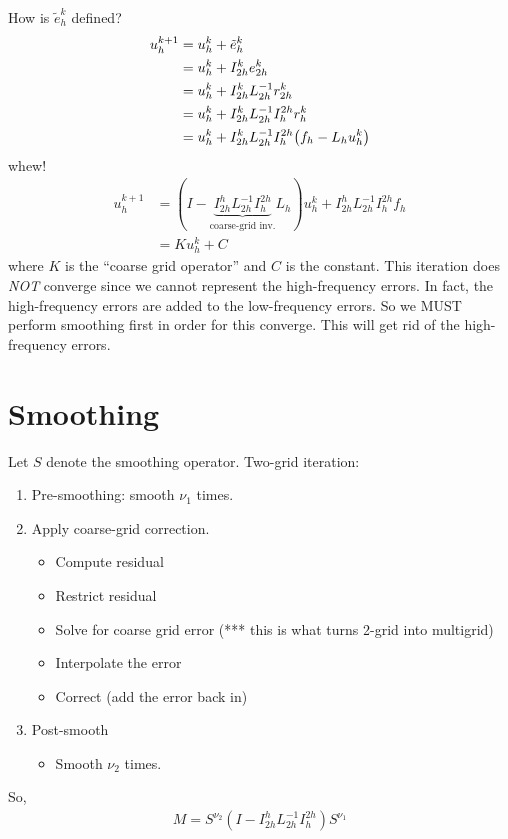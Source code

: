 \documentclass{article}
\begin{document}
        How is $\tilde{e}_h^k$ defined?
        \begin{align*}
            u_h^{k+1} &= u_h^k + \tilde{e}_h^k \\
            &= u_h^k + I_{2h}^ke_{2h}^k \\
            &= u_h^k + I_{2h}^kL_{2h}^{-1}r_{2h}^k \\
            &= u_h^k + I_{2h}^kL_{2h}^{-1}I_h^{2h}r_h^k \\
            &= u_h^k + I_{2h}^kL_{2h}^{-1}I_h^{2h}\qty(f_h - L_hu_h^k)
        \end{align*}
        whew!
        \begin{align*}
            u_h^{k+1} &= (I - \underbrace{I_{2h}^hL_{2h}^{-1}I_h^{2h}}_{\text{coarse-grid inv.}}L_h)u_h^k + I_{2h}^hL_{2h}^{-1}I_h^{2h}f_h \\
            &= Ku_h^k + C
        \end{align*}
        where $K$ is the ``coarse grid operator'' and $C$ is the constant.  This iteration does \emph{NOT} converge since we cannot represent the high-frequency errors.  In fact, the high-frequency errors are added to the low-frequency errors.  So we MUST perform smoothing first in order for this converge.  This will get rid of the high-frequency errors.

    \section{Smoothing}

        Let $S$ denote the smoothing operator.  Two-grid iteration:
        \begin{enumerate}
            \item Pre-smoothing: smooth $\nu_1$ times.
            \item Apply coarse-grid correction.
            \begin{itemize}
                \item Compute residual
                \item Restrict residual
                \item Solve for coarse grid error (*** this is what turns 2-grid into multigrid)
                \item Interpolate the error
                \item Correct (add the error back in)
            \end{itemize}
            \item Post-smooth
            \begin{itemize}
                \item Smooth $\nu_2$ times.
            \end{itemize}
        \end{enumerate}
        So,
        \begin{align*}
            M = S^{\nu_2}(I - I_{2h}^hL_{2h}^{-1}I_h^{2h})S^{\nu_1}
        \end{align*}
\end{document}
